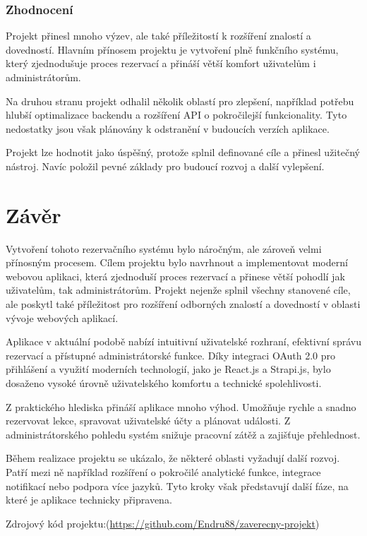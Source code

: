 \documentclass[12pt, a4paper,
openright
]{report}
\begin{document}
\subsection{Zhodnocení}
Projekt přinesl mnoho výzev, ale také příležitostí k rozšíření znalostí a dovedností.
Hlavním přínosem projektu je vytvoření plně funkčního systému, který zjednodušuje proces rezervací a přináší větší komfort uživatelům i administrátorům.

Na druhou stranu projekt odhalil několik oblastí pro zlepšení, například potřebu hlubší optimalizace backendu a rozšíření API o pokročilejší funkcionality. Tyto nedostatky jsou však plánovány k odstranění v budoucích verzích aplikace.

Projekt lze hodnotit jako úspěšný, protože splnil definované cíle a přinesl užitečný nástroj. Navíc položil pevné základy pro budoucí rozvoj a další vylepšení.

        
				\chapter*{Závěr}
                Vytvoření tohoto rezervačního systému bylo náročným, ale zároveň velmi přínosným procesem. Cílem projektu bylo navrhnout a implementovat moderní webovou aplikaci, která zjednoduší proces rezervací a přinese větší pohodlí jak uživatelům, tak administrátorům. Projekt nejenže splnil všechny stanovené cíle, ale poskytl také příležitost pro rozšíření odborných znalostí a dovedností v oblasti vývoje webových aplikací.

Aplikace v aktuální podobě nabízí intuitivní uživatelské rozhraní, efektivní správu rezervací a přístupné administrátorské funkce. Díky integraci OAuth 2.0 pro přihlášení a využití moderních technologií, jako je React.js a Strapi.js, bylo dosaženo vysoké úrovně uživatelského komfortu a technické spolehlivosti.

Z praktického hlediska přináší aplikace mnoho výhod. Umožňuje rychle a snadno rezervovat lekce, spravovat uživatelské účty a plánovat události. Z administrátorského pohledu systém snižuje pracovní zátěž a zajišťuje přehlednost.

Během realizace projektu se ukázalo, že některé oblasti vyžadují další rozvoj. Patří mezi ně například rozšíření o pokročilé analytické funkce, integrace notifikací nebo podpora více jazyků. Tyto kroky však představují další fáze, na které je aplikace technicky připravena.
	
Zdrojový kód projektu:(\url{https://github.com/Endru88/zaverecny-projekt})
	
\end{document}
